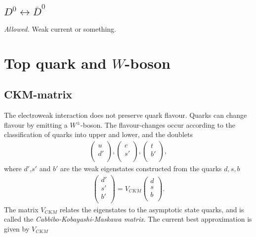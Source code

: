 \documentclass[11pt]{article}
\begin{document}
\begin{multicols}{2}
\subsection{$D^0 \leftrightarrow \bar{D}^0$}
\textit{Allowed.} Weak current or something.

\pagebreak




\section{Top quark and $W$-boson}

\subsection*{CKM-matrix}
\begin{flushleft}
The electroweak interaction does not preserve quark flavour. Quarks can change flavour by emitting a $W^{\pm}$-boson. The flavour-changes occur according to the classification of quarks into upper and lower, and the doublets
\begin{align*}
\begin{pmatrix}
u\\
d'\\
\end{pmatrix},
\begin{pmatrix}
c\\
s'\\
\end{pmatrix},
\begin{pmatrix}
t\\
b'\\
\end{pmatrix},
\end{align*}
where $d'$,$s'$ and $b'$ are the weak eigenstates constructed from the quarks $d,s,b$
\begin{align*}
\begin{pmatrix}
d'\\
s'\\
b'\\
\end{pmatrix} = 
V_{CKM} \begin{pmatrix}
d\\
s\\
b\\
\end{pmatrix}.
\end{align*}
The matrix $V_{CKM}$ relates the eigenstates to the asymptotic state quarks, and is called the \textit{Cabbibo-Kobayashi-Maskawa matrix}. The current best approximation is given by $V_{CKM}$

\end{flushleft}
\end{multicols}
\end{document}
